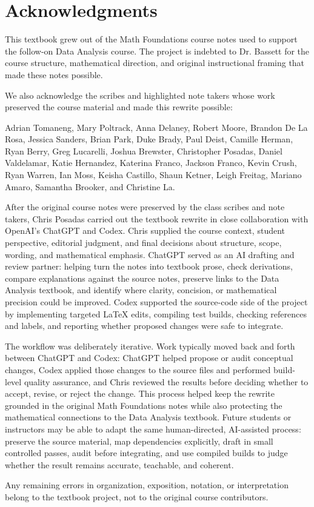 \chapter*{Acknowledgments}

This textbook grew out of the Math Foundations course notes used to support the follow-on Data Analysis course. The project is indebted to Dr. Bassett for the course structure, mathematical direction, and original instructional framing that made these notes possible.

We also acknowledge the scribes and highlighted note takers whose work preserved the course material and made this rewrite possible:

Adrian Tomaneng, Mary Poltrack, Anna Delaney, Robert Moore, Brandon De La Rosa, Jessica Sanders, Brian Park, Duke Brady, Paul Deist, Camille Herman, Ryan Berry, Greg Lucarelli, Joshua Brewster, Christopher Posadas, Daniel Valdelamar, Katie Hernandez, Katerina Franco, Jackson Franco, Kevin Crush, Ryan Warren, Ian Moss, Keisha Castillo, Shaun Ketner, Leigh Freitag, Mariano Amaro, Samantha Brooker, and Christine La.

After the original course notes were preserved by the class scribes and note takers, Chris Posadas carried out the textbook rewrite in close collaboration with OpenAI's ChatGPT and Codex. Chris supplied the course context, student perspective, editorial judgment, and final decisions about structure, scope, wording, and mathematical emphasis. ChatGPT served as an AI drafting and review partner: helping turn the notes into textbook prose, check derivations, compare explanations against the source notes, preserve links to the Data Analysis textbook, and identify where clarity, concision, or mathematical precision could be improved. Codex supported the source-code side of the project by implementing targeted LaTeX edits, compiling test builds, checking references and labels, and reporting whether proposed changes were safe to integrate.

The workflow was deliberately iterative. Work typically moved back and forth between ChatGPT and Codex: ChatGPT helped propose or audit conceptual changes, Codex applied those changes to the source files and performed build-level quality assurance, and Chris reviewed the results before deciding whether to accept, revise, or reject the change. This process helped keep the rewrite grounded in the original Math Foundations notes while also protecting the mathematical connections to the Data Analysis textbook. Future students or instructors may be able to adapt the same human-directed, AI-assisted process: preserve the source material, map dependencies explicitly, draft in small controlled passes, audit before integrating, and use compiled builds to judge whether the result remains accurate, teachable, and coherent.

Any remaining errors in organization, exposition, notation, or interpretation belong to the textbook project, not to the original course contributors.
